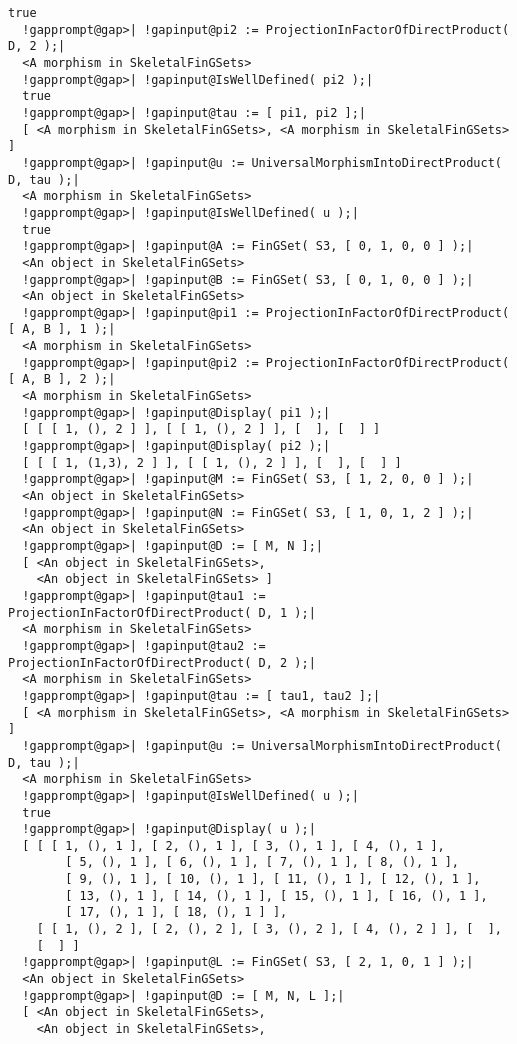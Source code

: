 \documentclass[a4paper,11pt]{report}
\begin{document}
{{{\begin{Verbatim}[commandchars=!@|,fontsize=\small,frame=single,label=Example]
  true
  !gapprompt@gap>| !gapinput@pi2 := ProjectionInFactorOfDirectProduct( D, 2 );|
  <A morphism in SkeletalFinGSets>
  !gapprompt@gap>| !gapinput@IsWellDefined( pi2 );|
  true
  !gapprompt@gap>| !gapinput@tau := [ pi1, pi2 ];|
  [ <A morphism in SkeletalFinGSets>, <A morphism in SkeletalFinGSets> ]
  !gapprompt@gap>| !gapinput@u := UniversalMorphismIntoDirectProduct( D, tau );|
  <A morphism in SkeletalFinGSets>
  !gapprompt@gap>| !gapinput@IsWellDefined( u );|
  true
  !gapprompt@gap>| !gapinput@A := FinGSet( S3, [ 0, 1, 0, 0 ] );|
  <An object in SkeletalFinGSets>
  !gapprompt@gap>| !gapinput@B := FinGSet( S3, [ 0, 1, 0, 0 ] );|
  <An object in SkeletalFinGSets>
  !gapprompt@gap>| !gapinput@pi1 := ProjectionInFactorOfDirectProduct( [ A, B ], 1 );|
  <A morphism in SkeletalFinGSets>
  !gapprompt@gap>| !gapinput@pi2 := ProjectionInFactorOfDirectProduct( [ A, B ], 2 );|
  <A morphism in SkeletalFinGSets>
  !gapprompt@gap>| !gapinput@Display( pi1 );|
  [ [ [ 1, (), 2 ] ], [ [ 1, (), 2 ] ], [  ], [  ] ]
  !gapprompt@gap>| !gapinput@Display( pi2 );|
  [ [ [ 1, (1,3), 2 ] ], [ [ 1, (), 2 ] ], [  ], [  ] ]
  !gapprompt@gap>| !gapinput@M := FinGSet( S3, [ 1, 2, 0, 0 ] );|
  <An object in SkeletalFinGSets>
  !gapprompt@gap>| !gapinput@N := FinGSet( S3, [ 1, 0, 1, 2 ] );|
  <An object in SkeletalFinGSets>
  !gapprompt@gap>| !gapinput@D := [ M, N ];|
  [ <An object in SkeletalFinGSets>, 
    <An object in SkeletalFinGSets> ]
  !gapprompt@gap>| !gapinput@tau1 := ProjectionInFactorOfDirectProduct( D, 1 );|
  <A morphism in SkeletalFinGSets>
  !gapprompt@gap>| !gapinput@tau2 := ProjectionInFactorOfDirectProduct( D, 2 );|
  <A morphism in SkeletalFinGSets>
  !gapprompt@gap>| !gapinput@tau := [ tau1, tau2 ];|
  [ <A morphism in SkeletalFinGSets>, <A morphism in SkeletalFinGSets> ]
  !gapprompt@gap>| !gapinput@u := UniversalMorphismIntoDirectProduct( D, tau );|
  <A morphism in SkeletalFinGSets>
  !gapprompt@gap>| !gapinput@IsWellDefined( u );|
  true
  !gapprompt@gap>| !gapinput@Display( u );|
  [ [ [ 1, (), 1 ], [ 2, (), 1 ], [ 3, (), 1 ], [ 4, (), 1 ], 
        [ 5, (), 1 ], [ 6, (), 1 ], [ 7, (), 1 ], [ 8, (), 1 ], 
        [ 9, (), 1 ], [ 10, (), 1 ], [ 11, (), 1 ], [ 12, (), 1 ], 
        [ 13, (), 1 ], [ 14, (), 1 ], [ 15, (), 1 ], [ 16, (), 1 ], 
        [ 17, (), 1 ], [ 18, (), 1 ] ], 
    [ [ 1, (), 2 ], [ 2, (), 2 ], [ 3, (), 2 ], [ 4, (), 2 ] ], [  ], 
    [  ] ]
  !gapprompt@gap>| !gapinput@L := FinGSet( S3, [ 2, 1, 0, 1 ] );|
  <An object in SkeletalFinGSets>
  !gapprompt@gap>| !gapinput@D := [ M, N, L ];|
  [ <An object in SkeletalFinGSets>,
    <An object in SkeletalFinGSets>, 

\end{Verbatim}}}}
\end{document}
